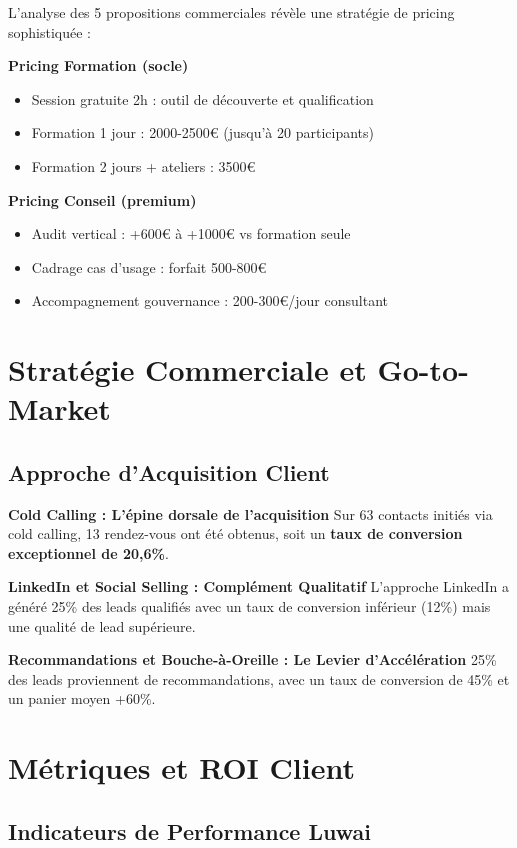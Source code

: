 \documentclass[12pt,a4paper]{report}
\begin{document}
L'analyse des 5 propositions commerciales \cite{luwai2025aesio,luwai2025antilogy,luwai2025integrhale,luwai2025carecall,luwai2025tectona} révèle une stratégie de pricing sophistiquée :

\textbf{Pricing Formation (socle)}
\begin{itemize}
\item Session gratuite 2h : outil de découverte et qualification
\item Formation 1 jour : 2000-2500€ (jusqu'à 20 participants)
\item Formation 2 jours + ateliers : 3500€
\end{itemize}

\textbf{Pricing Conseil (premium)}
\begin{itemize}
\item Audit vertical : +600€ à +1000€ vs formation seule
\item Cadrage cas d'usage : forfait 500-800€
\item Accompagnement gouvernance : 200-300€/jour consultant
\end{itemize}

\section{Stratégie Commerciale et Go-to-Market}

\subsection{Approche d'Acquisition Client}

\textbf{Cold Calling : L'épine dorsale de l'acquisition}
Sur 63 contacts initiés via cold calling, 13 rendez-vous ont été obtenus, soit un \textbf{taux de conversion exceptionnel de 20,6\%}.

\textbf{LinkedIn et Social Selling : Complément Qualitatif}
L'approche LinkedIn a généré 25\% des leads qualifiés avec un taux de conversion inférieur (12\%) mais une qualité de lead supérieure.

\textbf{Recommandations et Bouche-à-Oreille : Le Levier d'Accélération}
25\% des leads proviennent de recommandations, avec un taux de conversion de 45\% et un panier moyen +60\%.

\section{Métriques et ROI Client}

\subsection{Indicateurs de Performance Luwai}
\end{document}
